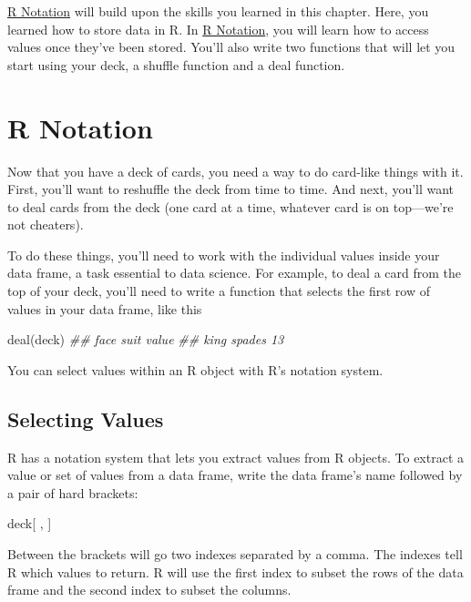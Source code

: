 \documentclass[
  letterpaper,
  DIV=11,
  numbers=noendperiod]{scrbook}
\newenvironment{Shaded}{\begin{snugshade}}{\end{snugshade}}
\newcommand{\DocumentationTok}[1]{\textcolor[rgb]{0.37,0.37,0.37}{\textit{#1}}}
\newcommand{\FunctionTok}[1]{\textcolor[rgb]{0.28,0.35,0.67}{#1}}
\newcommand{\NormalTok}[1]{\textcolor[rgb]{0.00,0.23,0.31}{#1}}
\begin{document}
\hyperref[sec-r-notation]{R Notation} will build upon the skills you
learned in this chapter. Here, you learned how to store data in R. In
\hyperref[sec-r-notation]{R Notation}, you will learn how to access
values once they've been stored. You'll also write two functions that
will let you start using your deck, a shuffle function and a deal
function.

\chapter{R Notation}\label{sec-r-notation}

Now that you have a deck of cards, you need a way to do card-like things
with it. First, you'll want to reshuffle the deck from time to time. And
next, you'll want to deal cards from the deck (one card at a time,
whatever card is on top---we're not cheaters).

To do these things, you'll need to work with the individual values
inside your data frame, a task essential to data science. For example,
to deal a card from the top of your deck, you'll need to write a
function that selects the first row of values in your data frame, like
this

\begin{Shaded}
\begin{Highlighting}[]
\FunctionTok{deal}\NormalTok{(deck)}
\DocumentationTok{\#\#  face   suit value}
\DocumentationTok{\#\#  king spades    13}
\end{Highlighting}
\end{Shaded}

You can select values within an R object with R's notation system.

\section{Selecting Values}\label{selecting-values}

R has a notation system that lets you extract values from R objects. To
extract a value or set of values from a data frame, write the data
frame's name followed by a pair of hard brackets:

\begin{Shaded}
\begin{Highlighting}[]
\NormalTok{deck[ , ]}
\end{Highlighting}
\end{Shaded}

Between the brackets will go two indexes separated by a comma. The
indexes tell R which values to return. R will use the first index to
subset the rows of the data frame and the second index to subset the
columns.
\end{document}
